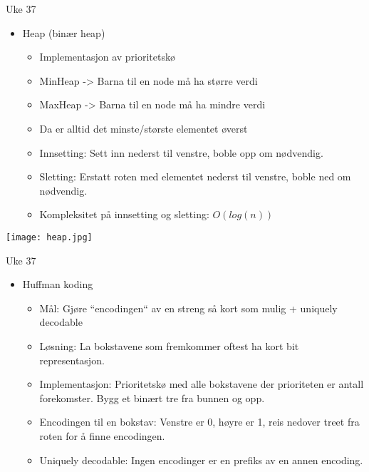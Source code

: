 \documentclass[norsk]{beamer}
\begin{document}
	\begin{frame}{Uke 37}

		\begin{itemize}
			\item Heap (binær heap)
				\begin{itemize}
					\item Implementasjon av prioritetskø
					\item MinHeap -> Barna til en node må ha større verdi
					\item MaxHeap -> Barna til en node må ha mindre verdi
					\item Da er alltid det minste/største elementet øverst
					\item Innsetting: Sett inn nederst til venstre, boble opp om
						nødvendig.
					\item Sletting: Erstatt roten med elementet nederst til venstre,
						boble ned om nødvendig.
					\item Kompleksitet på innsetting og sletting: $O(log(n))$
				\end{itemize}
		\end{itemize}

		\begin{center}
			\texttt{[image: heap.jpg]}
		\end{center}
	\end{frame}

	\begin{frame}{Uke 37}
		\begin{itemize}
			\item Huffman koding

			\begin{itemize}
				\item Mål: Gjøre ``encodingen`` av en streng så kort som mulig + uniquely
					decodable
				\item Løsning: La bokstavene som fremkommer oftest ha kort bit
					representasjon.
				\item Implementasjon: Prioritetskø med alle bokstavene der prioriteten er
					antall forekomster. Bygg et binært tre fra bunnen og opp.
				\item Encodingen til en bokstav: Venstre er 0, høyre er 1, reis nedover
					treet fra roten for å finne encodingen.
				\item Uniquely decodable: Ingen encodinger er en prefiks av en annen
					encoding.
			\end{itemize}
		\end{itemize}
	\end{frame}
\end{document}
